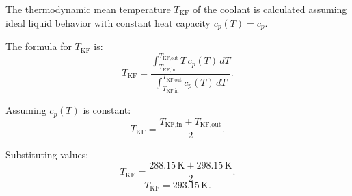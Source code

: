 The thermodynamic mean temperature \( T_{\text{KF}} \) of the coolant is calculated assuming ideal liquid behavior with constant heat capacity \( c_p(T) = c_p \).  

The formula for \( T_{\text{KF}} \) is:  
\[
T_{\text{KF}} = \frac{\int_{T_{\text{KF,in}}}^{T_{\text{KF,out}}} T \, c_p(T) \, dT}{\int_{T_{\text{KF,in}}}^{T_{\text{KF,out}}} c_p(T) \, dT}.
\]  

Assuming \( c_p(T) \) is constant:  
\[
T_{\text{KF}} = \frac{T_{\text{KF,in}} + T_{\text{KF,out}}}{2}.
\]  

Substituting values:  
\[
T_{\text{KF}} = \frac{288.15 \, \text{K} + 298.15 \, \text{K}}{2}.
\]  
\[
T_{\text{KF}} = 293.15 \, \text{K}.
\]